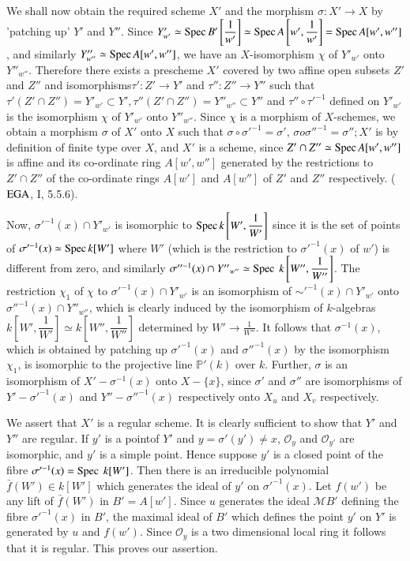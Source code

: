 We shall now obtain the required scheme $X'$ and the morphism $\sigma
: X' \rightarrow X$ by 'patching up' $Y'$ and $Y''$. Since $Y'_{w'}
\simeq \operatorname{Spec} B'\left[ \dfrac{1}{w'} \right] \simeq  \operatorname{Spec}  A \left[ w',
  \dfrac{1}{w'} \right] = \operatorname{Spec} A [w' , w'']$, and similarly $Y''_{w''}
\simeq \operatorname{Spec} A [w' , w'']$, we have an $X$-isomorphism $\chi$ of $Y'_{w'}$ onto
$Y''_{w''}$. Therefore there exists a prescheme $X'$ covered by two
affine open subsets $Z'$ and $Z''$ and isomorphisms\pageoriginale $\tau ' : Z'
\rightarrow Y'$ and $\tau '' : Z'' \rightarrow Y''$ such that $\tau ' (Z'
\cap Z'') = Y'_{w'} \subset Y', \tau '' (Z' \cap Z'') = Y''_{w''} \subset
Y''$ and $\tau'' \circ {\tau'}^{-1}$ defined on $Y'_{w'}$ is the
isomorphism $\chi$ of $Y'_{w'}$ onto $Y''_{w''}$. Since $\chi$ is a morphism
of $X$-schemes, we obtain a morphism $\sigma$  of $X'$ onto $X$ such
that $\sigma \circ {\sigma'}^{-1} =  \sigma'$, $\sigma o \sigma''^{-1} =
\sigma''; X'$ is by definition of finite type over $X$, and $X'$ is a
scheme, since $Z' \cap Z'' \simeq \operatorname{Spec} A[w', w'']$ is affine and its
co-ordinate ring $A [w', w'']$ generated by the restrictions to $Z'
\cap Z''$ of the co-ordinate rings $A[w']$ and $A[w'']$ of  $Z'$ and
$Z''$ respectively. ($\operatorname{EGA}$, I, 5.5.6). 

Now, $\sigma'^{-1} (x) \cap Y'_{w'}$ is isomorphic to $\operatorname{Spec} k \left[W',
\dfrac{1}{W'}\right]$ since it is the set of points of $\sigma'^{-1} (x)
\simeq  \operatorname{Spec} k [W']$ where $W'$ (which is the restriction to
$\sigma'^{-1}(x)$ of $w'$) is different from zero, and similarly
$\sigma''^{-1} (x) \cap Y{''}_{w''} \simeq \operatorname{Spec} ~ k \left[ W'' ,
\dfrac{1}{W''} \right]$. The restriction $\chi_1$ of $\chi$ to
$\sigma'^{-1} (x)\cap Y'_{w'}$ is an isomorphism of $\sim'^{-1}(x)
\cap Y'_{w'}$ onto ${\sigma''}^{-1} (x) \cap Y''_{w''}$, which is clearly
induced by the isomorphism of $k$-algebras $k \left[W' ,
\dfrac{1}{W'}\right]\simeq k \left[W'' ,\dfrac{1}{W''}\right]$ determined by $W'
\rightarrow \frac{1}{W''}$. It follows that $\sigma^{-1} (x)$, which is
obtained by patching up $\sigma'^{-1} (x)$ and $\sigma''^{-1}(x)$ by
the isomorphism $\chi_1$, is isomorphic to the projective line
$\mathbb{P}' (k)$ over $k$. Further, $\sigma$ is an isomorphism of
$X' - \sigma^{-1} (x)$ onto $X-\{ x \}$, since $\sigma'$ and ${\sigma ''}$
are isomorphisms of $Y'-\sigma'^{-1} (x)$ and $Y '' - \sigma''^{-1}
(x)$ respectively onto $X_u$ and $X_v$ respectively. 
 
 We assert that $X'$ is a regular scheme. It is clearly sufficient to
 show that $Y'$ and $Y''$ are regular. If $y'$ is a
 point\pageoriginale of $Y'$ and 
 $y = \sigma'(y') \neq x$, $\mathscr{O}_{y}$ and $\mathscr{O}_{y'}$ are
 isomorphic, and $y'$ is a simple point. Hence suppose $y'$ is a closed point
 of the fibre $\sigma'^{-1} (x) = \operatorname{Spec} ~ k[W']$. Then there is an
 irreducible polynomial $\bar{f}(W') \in k [W']$ which generates the
 ideal of $y'$ on $\sigma'^{-1} (x)$. Let $f(w')$ be any lift of
 $\bar{f} (W')$ in $B' = A[w']$. Since $u$ generates the ideal
 $\mathcal{M} B'$ defining the fibre $\sigma'^{-1}(x)$ in $B'$, the
 maximal ideal of $B'$ which defines the point $y'$ on $Y'$ is
 generated by $u$ and $f(w')$. Since $\mathscr{O}_y$ is a two
 dimensional local ring it follows that it is regular. This proves our
 assertion.  
 
